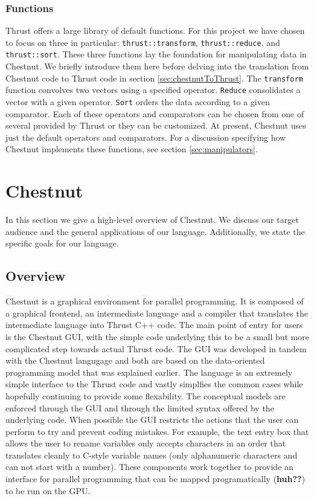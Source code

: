 \documentclass[twocolumn]{article}
\renewcommand{\|}{\origbar} %
\newcommand{\code}[1]{\texttt{#1}}
\begin{document}
\subsubsection{Functions}

Thrust offers a large library of default functions. For this project we have chosen to focus on three in particular: \code{thrust::transform}, \code{thrust::reduce}, and \code{thrust::sort}. These three functions lay the foundation for manipulating data in Chestnut. We briefly introduce them here before delving into the translation from Chestnut code to Thrust code in section \ref{sec:chestnutToThrust}. The \code{transform} function convolves two vectors using a specified operator. \code{Reduce} consolidates a vector with a given operator. \code{Sort} orders the data according to a given comparator. Each of these operators and comparators can be chosen from one of several provided by Thrust or they can be customized. At present, Chestnut uses just the default operators and comparators. For a discussion specifying how Chestnut implements these functions, see section \ref{sec:manipulators}.

\section{Chestnut}
\label{sec:chestnut}

In this section we give a high-level overview of Chestnut. We discuss our target audience and the general applications of our language. Additionally, we state the specific goals for our language.

\subsection{Overview}

Chestnut is a graphical environment for parallel programming. It is composed of a graphical frontend, an intermediate language and a compiler that translates the intermediate language into Thrust C++ code. The main point of entry for users is the Chestnut GUI, with the simple code underlying this to be a small but more complicated step towards actual Thrust code. The GUI was developed in tandem with the Chestnut langugage and both are based on the data-oriented programming model that was explained earlier. The language is an extremely simple interface to the Thrust code and vastly simplfies the common cases while hopefully continuing to provide some flexability. The conceptual models are enforced through the GUI and through the limited syntax offered by the underlying code. When possible the GUI restricts the actions that the user can perform to try and prevent coding mistakes. For example, the text entry box that allows the user to rename variables only accepts characters in an order that translates cleanly to C-style variable names (only alphanumeric characters and can not start with a number). These components work together to provide an interface for parallel programming that can be mapped programatically ({\bf huh??}) to be run on the GPU.
\end{document}
